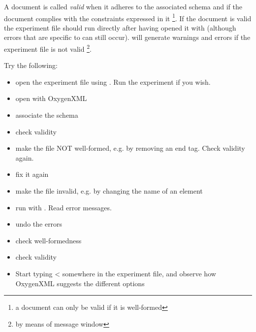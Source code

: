 A document is called \emph {valid} when it adheres to the
associated schema and if the document complies with the
constraints expressed in it \footnote{a document can only be valid
if it is well-formed}. If the document is valid the experiment
file should run directly after having opened it with \apex
(although errors that are specific to \apex can still occur).
\apex will generate warnings and errors if the
experiment file is not valid \footnote{by means of message
window}.


Try the following:

\begin{itemize}

\item open the experiment file
 using \apex. Run the
experiment if you wish.

\item open with OxygenXML

\item associate the \apex schema

\item check validity

\item make the file NOT well-formed, e.g. by removing an end tag.
Check validity again.

\item fix it again

\item make the file invalid, e.g. by changing the name of an
element

\item run with \apex. Read error messages.

\item undo the errors

\item check well-formedness

\item check validity

\item Start typing < somewhere in the experiment file, and observe how OxygenXML suggests the different options



\end{itemize}



